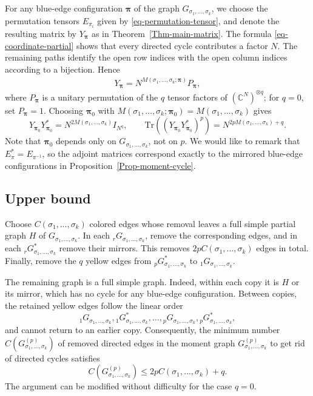 \documentclass[12pt]{article}
\numberwithin{equation}{section}
\theoremstyle{plain}
\def\bC{\mathbb C}
\def\Tr{\mathrm {Tr}}
\begin{document}
For any blue-edge configuration $\boldsymbol\pi$ of the graph $G_{\sigma_1,\ldots,\sigma_k}$, we choose the permutation tensors $E_{\pi_i}$ given by \eqref{eq-permutation-tensor}, and denote the resulting matrix by $Y_{\boldsymbol\pi}$ as in Theorem~\ref{Thm-main-matrix}. The formula \eqref{eq-coordinate-partial} shows that every directed cycle contributes a factor $N$. The remaining paths identify the open row indices with the open column indices according to a bijection. Hence
\begin{align*}
Y_{\boldsymbol\pi}=N^{M(\sigma_1,\ldots,\sigma_k;\boldsymbol\pi)} P_{\boldsymbol\pi},
\end{align*}
where $P_{\boldsymbol\pi}$ is a unitary permutation of the $q$ tensor factors of $(\bC^N)^{\otimes q}$; for $q=0$, set $P_{\boldsymbol\pi}=1$.
Choosing $\boldsymbol\pi_0$ with $M(\sigma_1,\ldots,\sigma_k;\boldsymbol\pi_0)=M(\sigma_1,\ldots,\sigma_k)$ gives
\begin{equation}\label{eq-moment-lower-attained}
Y_{\boldsymbol\pi_0}Y_{\boldsymbol\pi_0}^*=N^{2M(\sigma_1,\ldots,\sigma_k)}I_{N^q},\qquad
\Tr((Y_{\boldsymbol\pi_0}Y_{\boldsymbol\pi_0}^*)^p)=N^{2pM(\sigma_1,\ldots,\sigma_k)+q}.
\end{equation}
Note that $\boldsymbol\pi_0$ depends only on $G_{\sigma_1,\ldots,\sigma_k}$, not on $p$.
We would like to remark that $E_\pi^*=E_{\pi^{-1}}$, so the adjoint matrices correspond exactly to the mirrored  blue-edge configurations in Proposition~\ref{Prop-moment-cycle}.

\subsection{Upper bound}

Choose $C(\sigma_1,\ldots,\sigma_k)$ colored edges whose removal leaves a full simple partial graph $H$ of $G_{\sigma_1,\ldots,\sigma_k}$. In each ${}_rG_{\sigma_1,\ldots,\sigma_k}$, remove the corresponding edges, and in each ${}_rG^*_{\sigma_1,\ldots,\sigma_k}$ remove their mirrors. This removes $2pC(\sigma_1,\ldots,\sigma_k)$ edges in total. Finally, remove the $q$ yellow edges from ${}_pG^*_{\sigma_1,\ldots,\sigma_k}$ to ${}_1G_{\sigma_1,\ldots,\sigma_k}$.

The remaining graph is a full simple graph. Indeed, within each copy it is $H$ or its mirror, which has no cycle for any blue-edge configuration. Between copies, the retained yellow edges follow the linear order
\[{}_1G_{\sigma_1,\ldots,\sigma_k}, {}_1G^*_{\sigma_1,\ldots,\sigma_k}, \ldots,{}_pG_{\sigma_1,\ldots,\sigma_k}, {}_pG^*_{\sigma_1,\ldots,\sigma_k},\]
and cannot return to an earlier copy. Consequently, the minimum number $C(G^{(p)}_{\sigma_1,\ldots,\sigma_k})$ of removed directed edges in the moment graph $G^{(p)}_{\sigma_1,\ldots,\sigma_k}$ to get rid of directed cycles satisfies
\begin{equation}\label{eq-moment-cut-bound}
C(G^{(p)}_{\sigma_1,\ldots,\sigma_k})\le 2pC(\sigma_1,\ldots,\sigma_k)+q.
\end{equation}
The argument can be modified without difficulty for the case $q=0$.
\end{document}
